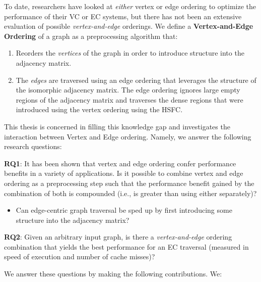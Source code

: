 To date, researchers have looked at \textit{either} vertex or edge ordering to optimize the performance of their \ac{VC} or \ac{EC} systems, but there has not been an extensive evaluation of possible \textit{vertex-and-edge} orderings. We define a \textbf{Vertex-and-Edge Ordering} of a graph as a preprocessing algorithm that:
\begin{enumerate}
    \item Reorders the \textit{vertices} of the graph in order to introduce structure into the adjacency matrix.\item The \textit{edges} are traversed using an edge ordering that leverages the structure of the isomorphic adjacency matrix. The edge ordering ignores large empty regions of the adjacency matrix and traverses the dense regions that were introduced using the vertex ordering using the \ac{HSFC}.
\end{enumerate}
This thesis is concerned in filling this knowledge gap and investigates the interaction between Vertex and Edge ordering. Namely, we answer the following research questions:

\textbf{RQ1}: It has been shown that vertex and edge ordering confer performance benefits in a variety of applications. Is it possible to combine vertex
and edge ordering as a preprocessing step such that the performance benefit gained by the combination of both is compounded (i.e., is greater than using either separately)?
\begin{itemize}
  \item Can edge-centric graph traversal be sped up by first introducing some structure into the adjacency matrix?
\end{itemize}

\textbf{RQ2}: Given an arbitrary input graph, is there a \textit{vertex-and-edge} ordering combination that yields the best performance for an \ac{EC} traversal (measured in speed of execution and number of cache misses)?

We answer these questions by making the following contributions. We:

